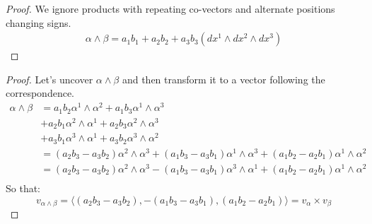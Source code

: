 \begin{proof}
	We ignore products with repeating co-vectors and alternate positions changing signs.
	\begin{align*}
		\alpha \wedge \beta = a_1 b_1 + a_2 b_2 + a_3 b_3 (dx^1 \wedge dx^2 \wedge dx^3 )
	\end{align*}
\end{proof}

\begin{problem}
\end{problem}

\begin{proof}
	Let's uncover $\alpha \wedge \beta$ and then transform it to a vector following the correspondence.
	\begin{align*}
		\alpha \wedge \beta & = a_1b_2 \alpha^1 \wedge \alpha^2 + a_1b_3 \alpha^1 \wedge \alpha^3                                                                    \\
		                    & + a_2b_1 \alpha^2 \wedge \alpha^1 + a_2b_3 \alpha^2 \wedge \alpha^3                                                                    \\
		                    & + a_3b_1 \alpha^3 \wedge \alpha^1 + a_3b_2 \alpha^3 \wedge \alpha^2                                                                    \\
		                    & = (a_2b_3 - a_3b_2) \alpha^2 \wedge \alpha^3  + (a_1b_3 - a_3b_1) \alpha^1 \wedge \alpha^3 + (a_1b_2 - a_2b_1)\alpha^1 \wedge \alpha^2 \\
		                    & = (a_2b_3 - a_3b_2) \alpha^2 \wedge \alpha^3  - (a_1b_3 - a_3b_1) \alpha^3 \wedge \alpha^1 + (a_1b_2 - a_2b_1)\alpha^1 \wedge \alpha^2 \\
	\end{align*}
	So that:
	$$v_{\alpha \wedge \beta} = \langle (a_2b_3 - a_3b_2), - (a_1b_3 - a_3b_1), (a_1b_2 - a_2b_1)\rangle = v_\alpha \times v_\beta$$
\end{proof}

\begin{problem}
\end{problem}


